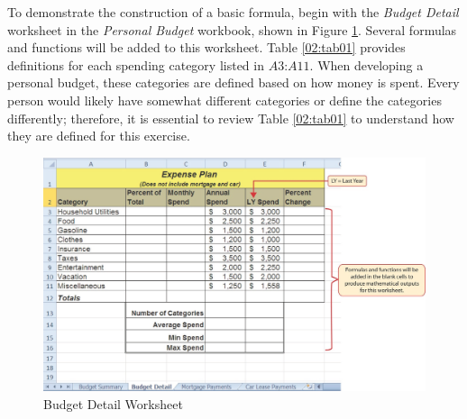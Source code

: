 To demonstrate the construction of a basic formula, begin with the \textit{Budget Detail} worksheet in the \textit{Personal Budget} workbook, shown in Figure \ref{02:fig02}. Several formulas and functions will be added to this worksheet. Table \ref{02:tab01} provides definitions for each spending category listed in $ A3 $:$ A11 $. When developing a personal budget, these categories are defined based on how money is spent. Every person would likely have somewhat different categories or define the categories differently; therefore, it is essential to review Table \ref{02:tab01} to understand how they are defined for this exercise.

\begin{figure}[H]
	\centering
	\includegraphics[width=\maxwidth{.95\linewidth}]{gfx/ch02_fig02}
	\caption{Budget Detail Worksheet}
	\label{02:fig02}
\end{figure}

